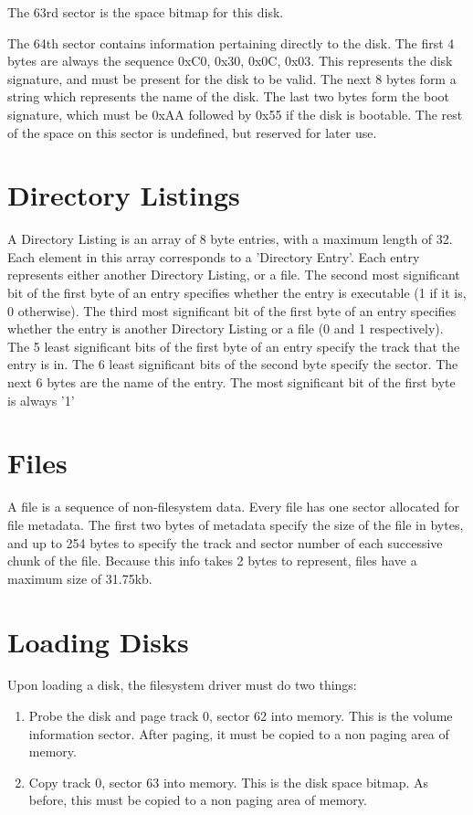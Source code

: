 \documentclass{article}
\begin{document}
The 63rd sector is the space bitmap for this disk.

The 64th sector contains information pertaining directly to the disk. The first 4 bytes are always the sequence 0xC0, 0x30, 0x0C, 0x03. This represents the disk
signature, and must be present for the disk to be valid. The next 8 bytes form a string which represents the name of the disk. The last two bytes form the boot signature,
which must be 0xAA followed by 0x55 if the disk is bootable. The rest of the space on this sector is undefined, but reserved for later use.

\section{Directory Listings}

A Directory Listing is an array of 8 byte entries, with a maximum length of 32. Each element in this array corresponds to a 'Directory Entry'.
Each entry represents either another Directory Listing, or a file. The second most significant bit of the first byte of an entry specifies whether the entry is executable
(1 if it is, 0 otherwise). The third most significant bit of the first byte of an entry specifies whether the entry is another Directory Listing or a file (0 and 1 respectively).
The 5 least significant bits of the first byte of an entry specify the track that the entry is in. The 6 least significant bits of the second byte specify the sector.
The next 6 bytes are the name of the entry. The most significant bit of the first byte is always '1'

\section{Files}

A file is a sequence of non-filesystem data. Every file has one sector allocated for file metadata. The first two bytes of metadata specify the size of the
file in bytes, and up to 254 bytes to specify the track and sector number of each successive chunk of the file. Because this info takes 2 bytes to represent,
files have a maximum size of 31.75kb.

\section{Loading Disks}

Upon loading a disk, the filesystem driver must do two things:

\begin{enumerate}
    \item Probe the disk and page track 0, sector 62 into memory. This is the volume information sector.
        After paging, it must be copied to a non paging area of memory.
    \item Copy track 0, sector 63 into memory. This is the disk space bitmap.
        As before, this must be copied to a non paging area of memory.
\end{enumerate}
\end{document}
